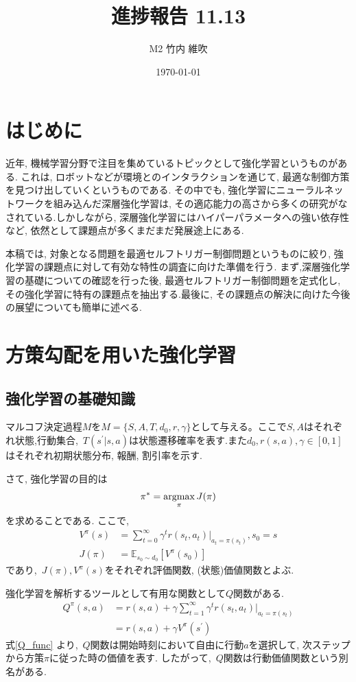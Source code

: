 \documentclass{jsarticle}
\title{\large{\bf{進捗報告 11.13}}}
\author{M2 竹内 維吹}
\date{\today}
\newcommand{\argmax}{\mathop{\rm argmax}\limits}
\newcommand{\expect}{\mathbb{E}}
\begin{document}
\maketitle


\section{はじめに}
近年, 機械学習分野で注目を集めているトピックとして強化学習というものがある. これは, ロボットなどが環境とのインタラクションを通じて, 最適な制御方策を見つけ出していくというものである. その中でも, 強化学習にニューラルネットワークを組み込んだ深層強化学習は, その適応能力の高さから多くの研究がなされている.しかしながら, 深層強化学習にはハイパーパラメータへの強い依存性など, 依然として課題点が多くまだまだ発展途上にある.\par
本稿では, 対象となる問題を最適セルフトリガー制御問題というものに絞り, 強化学習の課題点に対して有効な特性の調査に向けた準備を行う. まず,深層強化学習の基礎についての確認を行った後, 最適セルフトリガー制御問題を定式化し, その強化学習に特有の課題点を抽出する.最後に, その課題点の解決に向けた今後の展望についても簡単に述べる.

\section{方策勾配を用いた強化学習}
\subsection{強化学習の基礎知識}
マルコフ決定過程$M$を$M=\{S,A,T,d_0,r,\gamma\}$として与える。ここで$S,A$はそれぞれ状態,行動集合,~$T(s^{'}|s,a)$は状態遷移確率を表す.また$d_0,r(s,a),\gamma\in[0,1]$はそれぞれ初期状態分布, 報酬, 割引率を示す.\par
さて, 強化学習の目的は
\begin{equation}
	\pi^{*}=\argmax_{\pi}J(\pi) \label{purpose_of_rl}
\end{equation}を求めることである. ここで, 
\begin{align}
	V^{\pi}(s) &= \sum_{t=0}^{\infty}\gamma^tr(s_t, a_t)|_{a_t=\pi(s_t)}, s_0 = s\\
	J(\pi) &= \expect_{s_0\sim d_0}[V^{\pi}(s_0)]
\end{align}
であり,~$J(\pi), V^{\pi}(s)$をそれぞれ評価関数, (状態)価値関数とよぶ.\par
強化学習を解析するツールとして有用な関数として$Q$関数がある.
\begin{align}
	Q^{\pi}(s,a) &= r(s, a) + \gamma\sum_{t=1}^{\infty}\gamma^tr(s_t, a_t)|_{a_t=\pi(s_t)} \nonumber\\
			    &= r(s, a) + \gamma V^{\pi}(s^{\prime}) \label{Q_func}
\end{align}
式\eqref{Q_func} より,~$Q$関数は開始時刻において自由に行動$a$を選択して, 次ステップから方策$\pi$に従った時の価値を表す. したがって,~$Q$関数は行動価値関数という別名がある.
\end{document}
